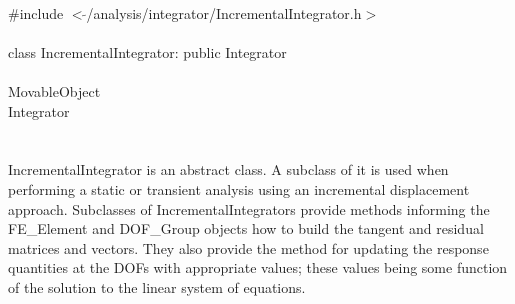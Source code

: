 
   \\
\indent \#include $<\tilde{ }$/analysis/integrator/IncrementalIntegrator.h$>$  \\

  \\
\indent class IncrementalIntegrator: public Integrator  \\

 \\
\indent MovableObject \\
\indent\indent Integrator \\
\indent\indent{} \\

 \\ 
\indent IncrementalIntegrator is an abstract class. A subclass of it
is used when performing a static or transient analysis using an
incremental displacement approach. Subclasses of
IncrementalIntegrators provide methods informing the FE\_Element and
DOF\_Group objects how to build the tangent and residual matrices and
vectors. They also provide the method for updating the response
quantities at the DOFs with appropriate values; these values being
some function of the solution to the linear system of equations. \\ 

